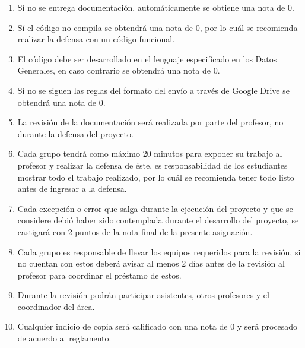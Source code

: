 \documentclass[11pt,a4paper]{scrartcl}			%
\providecommand{\tightlist}{%
          \setlength{\itemsep}{0pt}\setlength{\parskip}{0pt}}
\begin{document}
\begin{multicols*}{2}
\begin{enumerate}
\def\labelenumi{\arabic{enumi}.}
\tightlist
\item
  Sí no se entrega documentación, automáticamente se obtiene una nota de
  0.
\item
  Sí el código no compila se obtendrá una nota de 0, por lo cuál se
  recomienda realizar la defensa con un código funcional.
\item
  El código debe ser desarrollado en el lenguaje especificado en los
  Datos Generales, en caso contrario se obtendrá una nota de 0.
\item
  Sí no se siguen las reglas del formato del envío a través de Google
  Drive se obtendrá una nota de 0.
\item
  La revisión de la documentación será realizada por parte del profesor,
  no durante la defensa del proyecto.
\item
  Cada grupo tendrá como máximo 20 minutos para exponer su trabajo al
  profesor y realizar la defensa de éste, es responsabilidad de los
  estudiantes mostrar todo el trabajo realizado, por lo cuál se
  recomienda tener todo listo antes de ingresar a la defensa.
\item
  Cada excepción o error que salga durante la ejecución del proyecto y
  que se considere debió haber sido contemplada durante el desarrollo
  del proyecto, se castigará con 2 puntos de la nota final de la
  presente asignación.
\item
  Cada grupo es responsable de llevar los equipos requeridos para la
  revisión, si no cuentan con estos deberá avisar al menos 2 días antes
  de la revisión al profesor para coordinar el préstamo de estos.
\item
  Durante la revisión podrán participar asistentes, otros profesores y
  el coordinador del área.
\item
  Cualquier indicio de copia será calificado con una nota de 0 y será
  procesado de acuerdo al reglamento.
\end{enumerate}

~\vfill

\end{multicols*}
\end{document}
